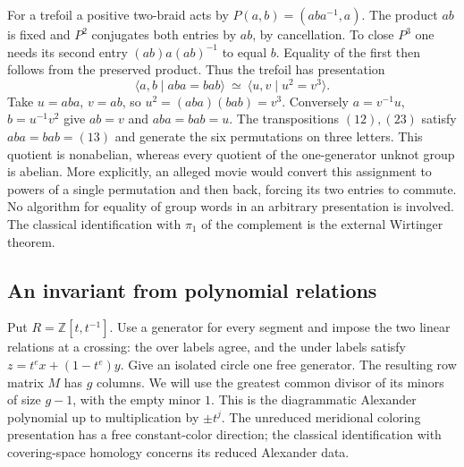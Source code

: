 For a trefoil a positive two-braid acts by $P(a,b)=(aba^{-1},a)$. The product $ab$ is fixed and $P^2$ conjugates both entries by $ab$, by cancellation. To close $P^3$ one needs its second entry $(ab)a(ab)^{-1}$ to equal $b$. Equality of the first then follows from the preserved product. Thus the trefoil has presentation
\[
 \langle a,b\mid aba=bab\rangle\ \simeq\ \langle u,v\mid u^2=v^3\rangle .
\]
Take $u=aba$, $v=ab$, so $u^2=(aba)(bab)=v^3$. Conversely $a=v^{-1}u$, $b=u^{-1}v^2$ give $ab=v$ and $aba=bab=u$. The transpositions $(12),(23)$ satisfy $aba=bab=(13)$ and generate the six permutations on three letters. This quotient is nonabelian, whereas every quotient of the one-generator unknot group is abelian. More explicitly, an alleged movie would convert this assignment to powers of a single permutation and then back, forcing its two entries to commute. No algorithm for equality of group words in an arbitrary presentation is involved. The classical identification with $\pi_1$ of the complement is the external Wirtinger theorem.

\subsection{An invariant from polynomial relations}
Put $R=\mathbb Z[t,t^{-1}]$. Use a generator for every segment and impose the two linear relations at a crossing: the over labels agree, and the under labels satisfy $z=t^e x+(1-t^e)y$. Give an isolated circle one free generator. The resulting row matrix $M$ has $g$ columns. We will use the greatest common divisor of its minors of size $g-1$, with the empty minor $1$. This is the diagrammatic Alexander polynomial up to multiplication by $\pm t^j$. The unreduced meridional coloring presentation has a free constant-color direction; the classical identification with covering-space homology concerns its reduced Alexander data.

